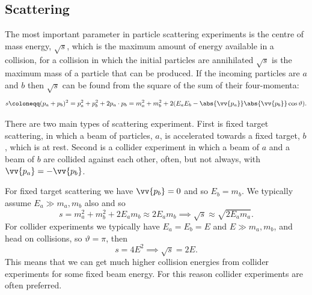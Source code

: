 \documentclass[fleqn]{NotesClass}
\begin{document}
    \subsection{Scattering}
    The most important parameter in particle scattering experiments is the centre of mass energy, \(\sqrt{s}\), which is the maximum amount of energy available in a collision, for a collision in which the initial particles are annihilated \(\sqrt{s}\) is the maximum mass of a particle that can be produced.
    If the incoming particles are \(a\) and \(b\) then \(\sqrt{s}\) can be found from the square of the sum of their four-momenta:
    \begin{equation}
        s \coloneqq (p_a + p_b)^2 = p_a^2 + p_b^2 + 2p_a \cdot p_b = m_a^2 + m_b^2 + 2(E_aE_b - \abs{\vv{p_a}} \abs{\vv{p_b}}\cos\vartheta).
    \end{equation}
    
    There are two main types of scattering experiment.
    First is fixed target scattering, in which a beam of particles, \(a\), is accelerated towards a fixed target, \(b\), which is at rest.
    Second is a collider experiment in which a beam of \(a\) and a beam of \(b\) are collided against each other, often, but not always, with \(\vv{p_a} = -\vv{p_b}\).
    
    For fixed target scattering we have \(\vv{p_b} = 0\) and so \(E_b = m_b\).
    We typically assume \(E_a \gg m_a, m_b\) also and so
    \begin{equation}
        s = m_a^2 + m_b^2 + 2E_am_b \approx 2E_am_b \implies \sqrt{s} \approx \sqrt{2E_am_a}.
    \end{equation}
    For collider experiments we typically have \(E_a = E_b = E\) and \(E \gg m_a, m_b\), and head on collisions, so \(\vartheta = \pi\), then
    \begin{equation}
        s = 4E^2 \implies \sqrt{s} = 2E.
    \end{equation}
    This means that we can get much higher collision energies from collider experiments for some fixed beam energy.
    For this reason collider experiments are often preferred.
    
\end{document}
